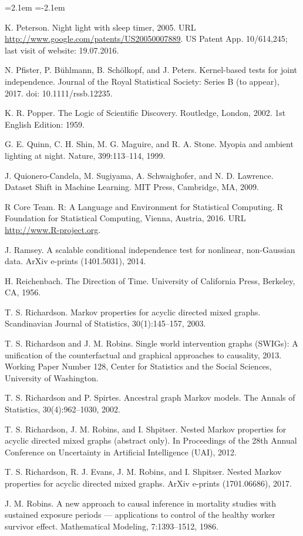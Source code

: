 \begin{list}{}{\leftmargin=2.1em
 \itemindent=-2.1em\parsep=0pt\itemsep=3pt}
\item K. Peterson. Night light with sleep timer, 2005. URL \url{http://www.google.com/patents/US20050007889}. US Patent App. 10/614,245; last visit of website: 19.07.2016.
\item N. Pfister, P. Bühlmann, B. Schölkopf, and J. Peters. Kernel-based tests for joint independence. Journal of the Royal Statistical Society: Series B (to appear), 2017. doi: 10.1111/rssb.12235.
\item K. R. Popper. The Logic of Scientific Discovery. Routledge, London, 2002. 1st English Edition: 1959.
\item G. E. Quinn, C. H. Shin, M. G. Maguire, and R. A. Stone. Myopia and ambient lighting at night. Nature, 399:113--114, 1999.
\item J. Quionero-Candela, M. Sugiyama, A. Schwaighofer, and N. D. Lawrence. Dataset Shift in Machine Learning. MIT Press, Cambridge, MA, 2009.
\item R Core Team. R: A Language and Environment for Statistical Computing. R Foundation for Statistical Computing, Vienna, Austria, 2016. URL \url{http://www.R-project.org}.
\item J. Ramsey. A scalable conditional independence test for nonlinear, non-Gaussian data. ArXiv e-prints (1401.5031), 2014.
\item H. Reichenbach. The Direction of Time. University of California Press, Berkeley, CA, 1956.
\item T. S. Richardson. Markov properties for acyclic directed mixed graphs. Scandinavian Journal of Statistics, 30(1):145--157, 2003.
\item T. S. Richardson and J. M. Robins. Single world intervention graphs (SWIGs): A unification of the counterfactual and graphical approaches to causality, 2013. Working Paper Number 128, Center for Statistics and the Social Sciences, University of Washington.
\item T. S. Richardson and P. Spirtes. Ancestral graph Markov models. The Annals of Statistics, 30(4):962--1030, 2002.
\item T. S. Richardson, J. M. Robins, and I. Shpitser. Nested Markov properties for acyclic directed mixed graphs (abstract only). In Proceedings of the 28th Annual Conference on Uncertainty in Artificial Intelligence (UAI), 2012.
\item T. S. Richardson, R. J. Evans, J. M. Robins, and I. Shpitser. Nested Markov properties for acyclic directed mixed graphs. ArXiv e-prints (1701.06686), 2017.
\item J. M. Robins. A new approach to causal inference in mortality studies with sustained exposure periods --- applications to control of the healthy worker survivor effect. Mathematical Modeling, 7:1393--1512, 1986.

\end{list}
